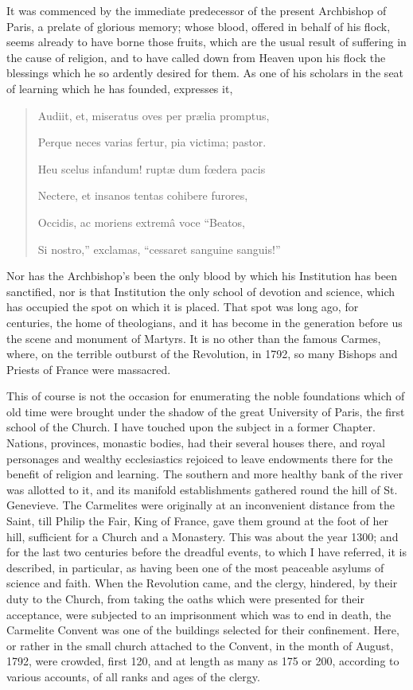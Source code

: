 It was commenced by the
immediate predecessor of the present Archbishop of Paris, a prelate of
glorious memory; whose blood, offered in behalf of his flock, seems
already to have borne those fruits, which are the usual result of
suffering in the cause of religion, and to have called down from
Heaven upon his flock the blessings which he so ardently desired for
them. As one of his scholars in the seat of learning which he has
founded, expresses it,

\begin{quote}

Audiit,
et, miseratus oves per prælia promptus,

Perque neces varias fertur, pia victima; pastor.

Heu scelus infandum! ruptæ dum fœdera pacis 

Nectere, et insanos tentas cohibere furores,

Occidis, ac moriens extremâ voce ``Beatos,

Si nostro,'' exclamas, ``cessaret sanguine sanguis!''

\end{quote}

Nor has the Archbishop's been
the only blood by which his Institution has been sanctified, nor is
that Institution the only school of devotion and science, which has
occupied the spot on which it is placed. That spot was long ago, for
centuries, the home of theologians, and it has become in the
generation before us the scene and monument of Martyrs. It is no other
than the famous Carmes, where, on the terrible outburst of the
Revolution, in 1792, so many Bishops and Priests of France were
massacred.

This of course is not the
occasion for enumerating the noble foundations which of old time were
brought under the shadow of the great University of Paris, the first
school of the Church. I have touched upon the subject in a former
Chapter. Nations, provinces, monastic bodies, had their several houses
there, and royal personages and wealthy ecclesiastics rejoiced to
leave endowments there for the benefit of religion and learning. The
southern and more healthy bank of the river was allotted to it, and
its manifold establishments gathered round the hill of St. Genevieve.
The Carmelites were originally at an inconvenient distance from the
Saint, till Philip the Fair, King of France, gave them ground at the
foot of her hill, sufficient for a Church and a Monastery. This was
about the year 1300; and for the last two centuries before the
dreadful events, to which I have referred, it is described, in
particular, as having been one of the most peaceable asylums of
science and faith. When the Revolution came, and the clergy, hindered,
by their duty to the Church, from taking the oaths which were
presented for their acceptance, were subjected to an
imprisonment which was to end in death, the Carmelite Convent was one
of the buildings selected for their confinement. Here, or rather in
the small church attached to the Convent, in the month of August,
1792, were crowded, first 120, and at length as many as 175 or 200,
according to various accounts, of all ranks and ages of the clergy.

